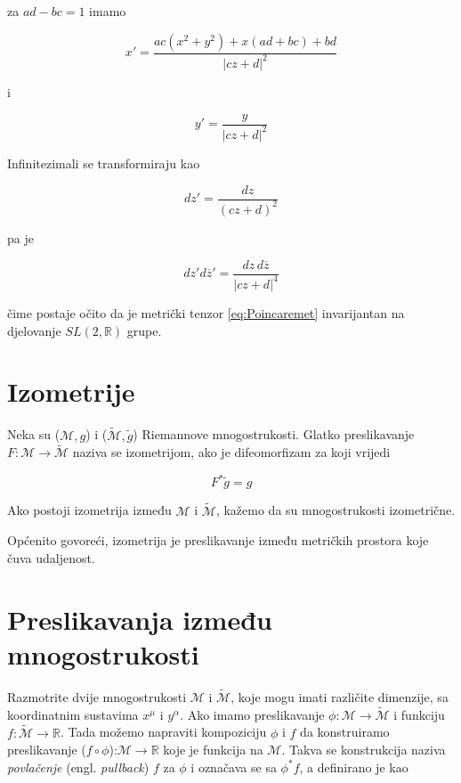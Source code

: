 \noindent za $ad-bc=1$ imamo

\begin{equation*}
x'=\frac{ac(x^2+y^2)+x(ad+bc)+bd}{|cz+d|^2}
\end{equation*}

\noindent i

\begin{equation*}
y'=\frac{y}{|cz+d|^2}
\end{equation*}

\noindent Infinitezimali se transformiraju kao

\begin{equation*}
dz'=\frac{dz}{(cz+d)^2}
\end{equation*}

\noindent pa je

\begin{equation*}
dz'd\overline{z}' = \frac{dz\,d\overline{z}}{|cz+d|^4}
\end{equation*}

\noindent čime postaje očito da je metrički tenzor \eqref{eq:Poincaremet} invarijantan na djelovanje $SL(2,\mathbb{R})$ grupe.

\section{Izometrije}

Neka su ($\mathcal{M}, g$) i ($\tilde{\mathcal{M}},\tilde{g}$) Riemannove mnogostrukosti. Glatko preslikavanje $F:\mathcal{M}\to \tilde{\mathcal{M}}$ naziva se izometrijom, ako je difeomorfizam za koji vrijedi

\begin{equation*}
F^*\tilde{g}=g
\end{equation*}

\noindent Ako postoji izometrija između $\mathcal{M}$ i $\tilde{\mathcal{M}}$, kažemo da su mnogostrukosti izometrične.

\noindent Općenito govoreći, izometrija je preslikavanje između metričkih prostora koje čuva udaljenost.

\section{Preslikavanja između mnogostrukosti}

Razmotrite dvije mnogostrukosti $\mathcal{M}$ i $\tilde{\mathcal{M}}$, koje mogu imati različite dimenzije, sa koordinatnim sustavima $x^\mu$ i $y^\alpha$. Ako imamo preslikavanje $\phi: \mathcal{M}\to \tilde{\mathcal{M}}$ i funkciju $f:\tilde{\mathcal{M}}\to \mathbb{R}$. Tada možemo napraviti kompoziciju $\phi$ i $f$ da konstruiramo preslikavanje ($f\circ \phi$):$\mathcal{M}\to \mathbb{R}$ koje je funkcija na $\mathcal{M}$. Takva se konstrukcija naziva \textit{povlačenje} (engl. \textit{pullback}) $f$ za $\phi$ i označava se sa $\phi^*f$, a definirano je kao

